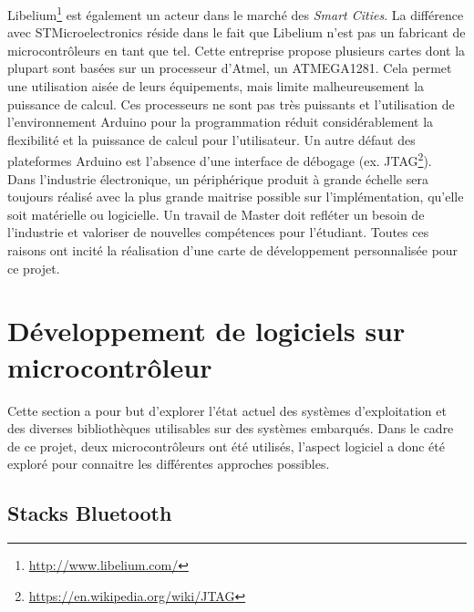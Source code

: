 Libelium\footnote{\url{http://www.libelium.com/}} est également un acteur dans le marché des \textit{Smart Cities}. La différence avec STMicroelectronics réside dans le fait que Libelium n'est pas un fabricant de microcontrôleurs en tant que tel. Cette entreprise propose plusieurs cartes dont la plupart sont basées sur un processeur d'Atmel, un ATMEGA1281. Cela permet une utilisation aisée de leurs équipements, mais limite malheureusement la puissance de calcul. Ces processeurs ne sont pas très puissants et l'utilisation de l'environnement Arduino pour la programmation réduit considérablement la flexibilité et la puissance de calcul pour l'utilisateur. Un autre défaut des plateformes Arduino est l'absence d'une interface de débogage (ex. JTAG\footnote{\url{https://en.wikipedia.org/wiki/JTAG}}).\\

Dans l'industrie électronique, un périphérique produit à grande échelle sera toujours réalisé avec la plus grande maitrise possible sur l'implémentation, qu'elle soit matérielle ou logicielle. Un travail de Master doit refléter un besoin de l'industrie et valoriser de nouvelles compétences pour l'étudiant. Toutes ces raisons ont incité la réalisation d'une carte de développement personnalisée pour ce projet. 





\section{Développement de logiciels sur microcontrôleur}

Cette section a pour but d'explorer l'état actuel des systèmes d'exploitation et des diverses bibliothèques utilisables sur des systèmes embarqués. Dans le cadre de ce projet, deux microcontrôleurs ont été utilisés, l'aspect logiciel a donc été exploré pour connaitre les différentes approches possibles.


\subsection{Stacks Bluetooth}

